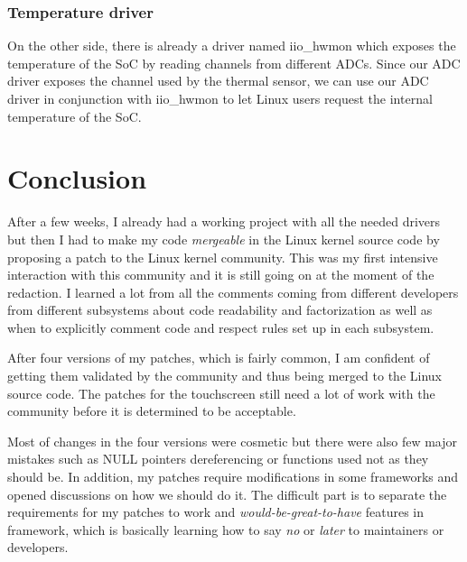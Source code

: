 \subsubsection{Temperature driver}

On the other side, there is already a driver named iio\_hwmon which exposes the temperature of the SoC by reading channels from different ADCs. Since our ADC driver exposes the channel used by the thermal sensor, we can use our ADC driver in conjunction with iio\_hwmon to let Linux users request the internal temperature of the SoC.

\section{Conclusion}
After a few weeks, I already had a working project with all the needed drivers but then I had to make my code \textit{mergeable} in the Linux kernel source code by proposing a patch to the Linux kernel community. This was my first intensive interaction with this community and it is still going on at the moment of the redaction. I learned a lot from all the comments coming from different developers from different subsystems about code readability and factorization as well as when to explicitly comment code and respect rules set up in each subsystem.

After four versions of my patches, which is fairly common, I am confident of getting them validated by the community and thus being merged to the Linux source code. The patches for the touchscreen still need a lot of work with the community before it is determined to be acceptable.

Most of changes in the four versions were cosmetic but there were also few major mistakes such as NULL pointers dereferencing or functions used not as they should be. In addition, my patches require modifications in some frameworks and opened discussions on how we should do it. The difficult part is to separate the requirements for my patches to work and \textit{would-be-great-to-have} features in framework, which is basically learning how to say \textit{no} or \textit{later} to maintainers or developers.

